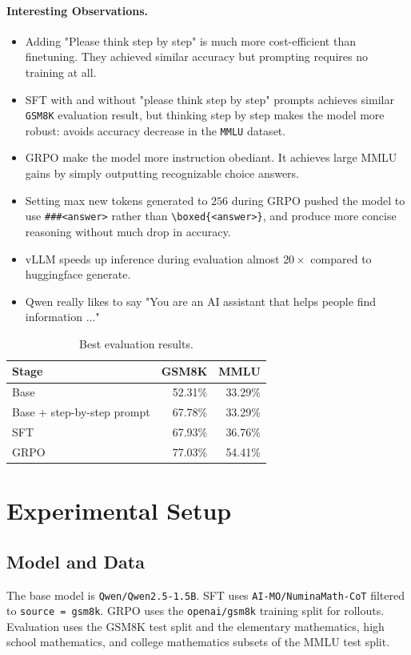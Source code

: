 \documentclass[11pt]{article}
\begin{document}
\paragraph{Interesting Observations.}
\begin{itemize}
    \item Adding "Please think step by step" is much more cost-efficient than finetuning. They achieved similar accuracy but prompting requires no training at all.
    \item SFT with and without "please think step by step" prompts achieves similar \texttt{GSM8K} evaluation result, but thinking step by step makes the model more robust: avoids accuracy decrease in the \texttt{MMLU} dataset.
    \item GRPO make the model more instruction obediant. It achieves large MMLU gains by simply outputting recognizable choice answers.
    \item Setting max new tokens generated to \(256\) during GRPO pushed the model to use \texttt{\#\#\#<answer>} rather than \verb|\boxed{<answer>}|, and produce more concise reasoning without much drop in accuracy.
    \item vLLM speeds up inference during evaluation almost \(20\times\) compared to huggingface generate.
    \item Qwen really likes to say "You are an AI assistant that helps people find information ..."
\end{itemize}

\begin{table}[t]
\centering
\caption{Best evaluation results.}
\label{tab:headline-results}
\begin{tabular}{l r r}
\toprule
Stage & GSM8K & MMLU \\
\midrule
Base & 52.31\% & 33.29\% \\
Base + step-by-step prompt & 67.78\% & 33.29\% \\
SFT & 67.93\% & 36.76\% \\
GRPO & 77.03\% & 54.41\% \\
\bottomrule
\end{tabular}
\end{table}

\section{Experimental Setup}
\subsection{Model and Data}
The base model is \texttt{Qwen/Qwen2.5-1.5B}. SFT uses \texttt{AI-MO/NuminaMath-CoT} filtered to \texttt{source = gsm8k}. GRPO uses the \texttt{openai/gsm8k} training split for rollouts. Evaluation uses the GSM8K test split and the elementary mathematics, high school mathematics, and college mathematics subsets of the MMLU test split.
\end{document}
